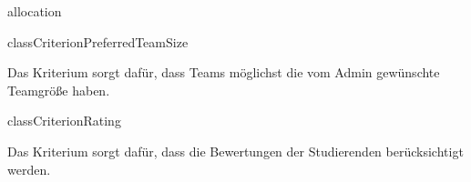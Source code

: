 \begin{texdocpackage}{allocation}
\begin{texdocclass}{class}{CriterionPreferredTeamSize}
\label{texdoclet:allocation.CriterionPreferredTeamSize}
\begin{texdocclassintro}
Das Kriterium sorgt dafür, dass Teams möglichst die vom Admin gewünschte
 Teamgröße haben.\end{texdocclassintro}
\begin{texdocclassconstructors}
\end{texdocclassconstructors}
\begin{texdocclassmethods}
\end{texdocclassmethods}
\end{texdocclass}


\begin{texdocclass}{class}{CriterionRating}
\label{texdoclet:allocation.CriterionRating}
\begin{texdocclassintro}
Das Kriterium sorgt dafür, dass die Bewertungen der Studierenden
 berücksichtigt werden.\end{texdocclassintro}
\begin{texdocclassconstructors}
\end{texdocclassconstructors}
\begin{texdocclassmethods}
\end{texdocclassmethods}
\end{texdocclass}



\end{texdocpackage}
